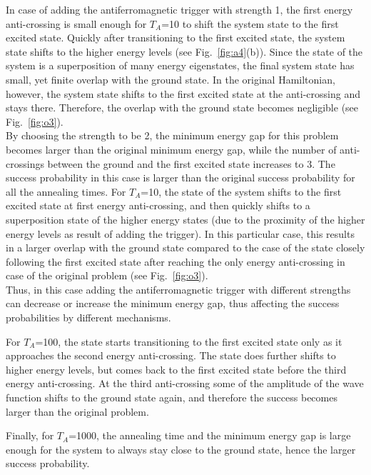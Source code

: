 \documentclass[../main.tex]{subfiles}
\begin{document}
In case of adding the antiferromagnetic trigger with strength 1, the first energy anti-crossing is small enough for $T_A$=10 to shift the system state to the first excited state. Quickly after transitioning to the first excited state, the system state shifts to the higher energy levels (see Fig.~\ref{fig:a4}(b)). Since the state of the system is a superposition of many energy eigenstates, the final system state has small, yet finite overlap with the ground state. In the original Hamiltonian, however, the system state shifts to the first excited state at the anti-crossing and stays there. Therefore, the overlap with the ground state becomes negligible (see Fig.~\ref{fig:o3}).\\

By choosing the strength to be 2, the minimum energy gap for this problem becomes larger than the original minimum energy gap, while the number of anti-crossings between the ground and the first excited state increases to 3. The success probability in this case is larger than the original success probability for all the annealing times. For $T_A$=10, the state of the system shifts to the first excited state at first energy anti-crossing, and then quickly shifts to a superposition state of the higher energy states (due to the proximity of the higher energy levels as result of adding the trigger). In this particular case, this results in a larger overlap with the ground state compared to the case of the state closely following the first excited state after reaching the only energy anti-crossing in case of the original problem (see Fig.~\ref{fig:o3}).\\
Thus, in this case adding the antiferromagnetic trigger with different strengths can decrease or increase the minimum energy gap, thus affecting the success probabilities by different mechanisms.

For $T_A$=100, the state starts transitioning to the first excited state only as it approaches the second energy anti-crossing. The state does further shifts to higher energy levels, but comes back to the first excited state before the third energy anti-crossing. At the third anti-crossing some of the amplitude of the wave function shifts to the ground state again, and therefore the success becomes larger than the original problem. 


Finally, for $T_A$=1000, the annealing time and the minimum energy gap is large enough for the system to always stay close to the ground state, hence the larger success probability.\\
\end{document}
